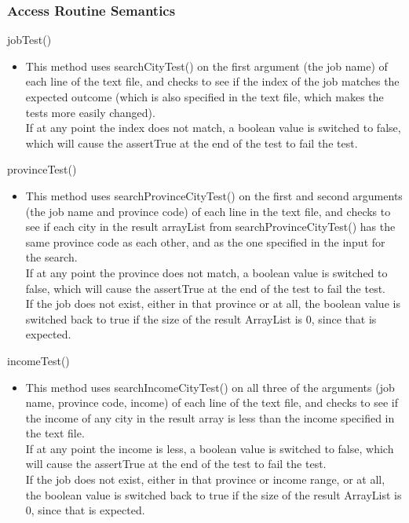 \documentclass[12pt,fleqn]{article}
\begin{document}
\subsubsection*{Access Routine Semantics}
\noindent jobTest()
\begin{itemize}
\item This method uses searchCityTest() on the first argument (the job name) of each line of the text file, and checks to see if the index of the job matches the expected outcome (which is also specified in the text file, which makes the tests more easily changed). 
\\If at any point the index does not match, a boolean value is switched to false, which will cause the assertTrue at the end of the test to fail the test.
\end{itemize}
\noindent provinceTest()
\begin{itemize}
\item This method uses searchProvinceCityTest() on the first and second arguments (the job name and province code) of each line in the text file, and checks to see if each city in the result arrayList from searchProvinceCityTest() has the same province code as each other, and as the one specified in the input for the search.
\\If at any point the province does not match, a boolean value is switched to false, which will cause the assertTrue at the end of the test to fail the test.
\\If the job does not exist, either in that province or at all, the boolean value is switched back to true if the size of the result ArrayList is 0, since that is expected.
\end{itemize}
\noindent incomeTest()
\begin{itemize}
\item This method uses searchIncomeCityTest() on all three of the arguments (job name, province code, income) of each line of the text file, and checks to see if the income of any city in the result array is less than the income specified in the text file.
\\If at any point the income is less, a boolean value is switched to false, which will cause the assertTrue at the end of the test to fail the test.
\\If the job does not exist, either in that province or income range, or at all, the boolean value is switched back to true if the size of the result ArrayList is 0, since that is expected.
\end{itemize}
\end{document}
